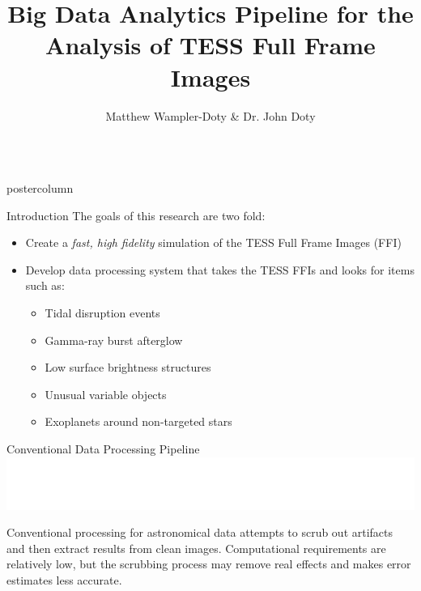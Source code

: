\documentclass[final,hyperref={pdfpagelabels=false}]{beamer}
\title{\LARGE Big Data Analytics Pipeline for the Analysis of TESS Full Frame Images}
\author{Matthew Wampler-Doty \& Dr. John Doty}
\institute[Noqsi Aerospace]{Noqsi Aerospace, Ltd. \& MIT}
\date[]{}
\newlength{\columnheight}
\begin{document}
\begin{frame}
  \begin{columns}
    \begin{column}{.49\textwidth}
      \begin{beamercolorbox}[center,wd=\textwidth]{postercolumn}
        \begin{minipage}[T]{.95\textwidth}  %
          \parbox[t][\columnheight]{\textwidth}{
            \begin{block}{Introduction}
            The goals of this research are two fold:
              \begin{itemize}
              \item Create a \emph{fast, high fidelity} simulation of the TESS Full Frame Images (FFI)
              \item Develop data processing system that takes the TESS FFIs and looks for items such as:
              \begin{itemize}
              	\item Tidal disruption events
	        \item Gamma-ray burst afterglow
		\item Low surface brightness structures
		\item Unusual variable objects
		\item Exoplanets around non-targeted stars
              \end{itemize}
              \end{itemize}              
            \end{block}

            \vspace{2cm}
            \begin{block}{Conventional Data Processing Pipeline}
              \includegraphics[width=0.95\linewidth]{figures/Conventional_Pipeline.pdf}
            \end{block}
	    Conventional processing for astronomical data attempts to scrub out artifacts and then extract results from clean images. Computational requirements are relatively low, but the scrubbing process may remove real effects and makes error estimates less accurate.

}
\end{minipage}
\end{beamercolorbox}
\end{column}
\end{columns}
\end{frame}
\end{document}
